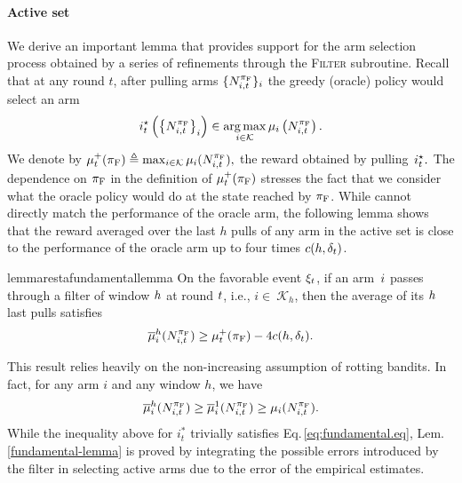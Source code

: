 \paragraph{Active set} We derive an important lemma that provides support for the arm selection process obtained by a series of refinements through the {\small \textsc{Filter}} subroutine. Recall that at any round $t$, after pulling arms $\{ N^{\pi_{\rm F}}_{i,t} \}_i$ the greedy (oracle) policy would select an arm 
%
\begin{align*}
i^\star_t \left(\left\{ N^{\pi_{\rm F}}_{i,t} \right\}_i\right)  \in  \operatorname*{arg\,max}_{i \in \mathcal{K}} \mu_i \left( N^{\pi_{\rm F}}_{i,t}\right).
\end{align*}
%
We denote by $\mu^+_t(\pi_{\rm F}) \triangleq \max_{i \in \mathcal{K}} \mu_i ( N^{\pi_{\rm F}}_{i,t}),$ the reward obtained by pulling~$i^\star_t.$ The dependence on $\pi_{\rm F}$ in the definition of $\mu^+_t(\pi_{\rm F})$ stresses the fact that we consider what the oracle policy would do at the state reached by $\pi_{\rm F}$.
While \myAlgorithm cannot directly match the performance of the oracle arm, the following lemma shows that the reward averaged over the last $h$ pulls of any arm in the active set is close to the performance of the oracle arm up to four times $c(h,  \delta_t)$.

\begin{restatable}{lemma}{restafundamentallemma}
\label{fundamental-lemma}
On the favorable event $\xi_t$, if an arm~$i$ passes through a filter of window $h$ at round $t$, i.e., $i\in\ \mathcal{K}_h$, then the average of its $h$ last pulls satisfies
%
\begin{equation}\label{eq:fundamental.eq}
\overline{\mu}^{h}_i(N_{i,t}^{\pi_{\rm F}} ) \geq  \mu^+_t(\pi_{\rm F}) - 4 c(h, \delta_t).
\end{equation}
%
\end{restatable}
This result  relies heavily on the non-increasing assumption of rotting bandits. In fact, for any arm $i$ and any window $h$, we have
%
\begin{equation*}
\overline{\mu}_i^h(N_{i,t}^{\pi_{\rm F}}) \geq \overline{\mu}_i^1(N_{i,t}^{\pi_{\rm F}}) \geq \mu_i(N_{i,t}^{\pi_{\rm F}}).
\end{equation*}
%
While the inequality above for $i_t^*$ trivially satisfies Eq.\,\ref{eq:fundamental.eq}, Lem.\,\ref{fundamental-lemma} is proved by integrating the possible errors introduced by the filter in selecting active arms due to the error of the empirical estimates.

